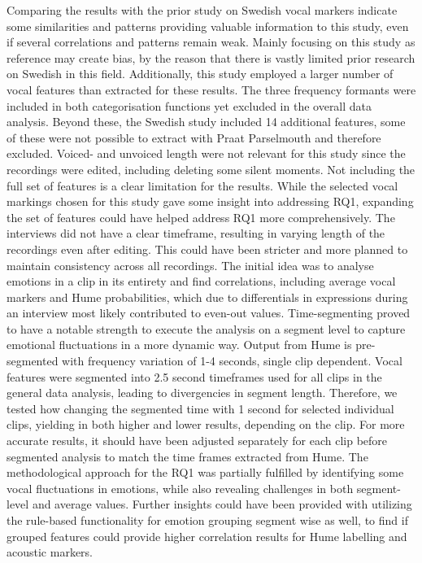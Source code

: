 \medskip
Comparing the results with the prior study on Swedish vocal markers indicate some similarities and patterns providing valuable information to this study, even if several correlations and patterns remain weak. Mainly focusing on this study as reference may create bias, by the reason that there is vastly limited prior research on Swedish in this field. Additionally, this study employed a larger number of vocal features than extracted for these results. The three frequency formants were included in both categorisation functions yet excluded in the overall data analysis. Beyond these, the Swedish study included 14 additional features, some of these were not possible to extract with Praat Parselmouth and therefore excluded. Voiced- and unvoiced length were not relevant for this study since the recordings were edited, including deleting some silent moments. Not including the full set of features is a clear limitation for the results. While the selected vocal markings chosen for this study gave some insight into addressing RQ1, expanding the set of features could have helped address RQ1 more comprehensively. The interviews did not have a clear timeframe, resulting in varying length of the recordings even after editing. This could have been stricter and more planned to maintain consistency across all recordings. 
The initial idea was to analyse emotions in a clip in its entirety and find correlations, including average vocal markers and Hume probabilities, which due to differentials in expressions during an interview most likely contributed to even-out values. Time-segmenting proved to have a notable strength to execute the analysis on a segment level to capture emotional fluctuations in a more dynamic way. Output from Hume is pre-segmented with frequency variation of 1-4 seconds, single clip dependent. Vocal features were segmented into 2.5 second timeframes used for all clips in the general data analysis, leading to divergencies in segment length. Therefore, we tested how changing the segmented time with 1 second for selected individual clips, yielding in both higher and lower results, depending on the clip. For more accurate results, it should have been adjusted separately for each clip before segmented analysis to match the time frames extracted from Hume. The methodological approach for the RQ1 was partially fulfilled by identifying some vocal fluctuations in emotions, while also revealing challenges in both segment-level and average values. Further insights could have been provided with utilizing the rule-based functionality for emotion grouping segment wise as well, to find if grouped features could provide higher correlation results for Hume labelling and acoustic markers. 
